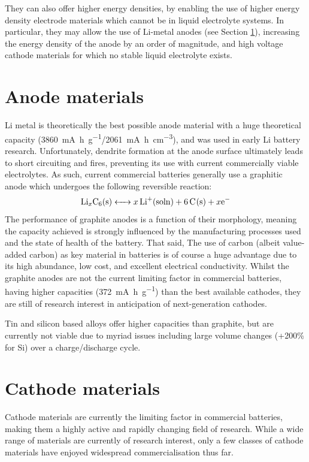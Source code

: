 They can also offer higher energy densities, by enabling the use of higher energy density electrode materials which cannot be in liquid electrolyte systems.
In particular, they may allow the use of Li-metal anodes (see Section \ref{sec:anodes}), increasing the energy density of the anode by an order of magnitude,\cite{Zhang2018} and high voltage cathode materials for which no stable liquid electrolyte exists.
\newpage
\section{Anode materials}
\label{sec:anodes}
Li metal is theoretically the best possible anode material with a huge theoretical capacity (\SI{3860}{\milli\ampere\hour\per\gram}/\SI{2061}{\milli\ampere\hour\per\centi\meter\cubed}), and was used in early Li battery research. 
Unfortunately, dendrite formation at the anode surface ultimately leads to short circuiting and fires, preventing its use with current commercially viable electrolytes. \cite{Cheng2017,Guo2017a,Lin2017}
As such, current commercial batteries generally use a graphitic anode which undergoes the following reversible reaction:
\begin{equation}
\ce{Li_xC6(s) <-> $x$Li+(soln) +6C(s) + $x$e-}
\end{equation}
The performance of graphite anodes is a function of their morphology, meaning the capacity achieved is strongly influenced by the manufacturing processes used and the state of health of the battery.
That said, 
The use of carbon (albeit value-added carbon) as key material in batteries is of course a huge advantage due to its high abundance, low cost, and excellent electrical conductivity.
Whilst the graphite anodes are not the current limiting factor in commercial batteries, having higher capacities (\SI{372}{\milli\ampere\hour\per\gram}) than the best available cathodes, they are still of research interest in anticipation of next-generation cathodes.

Tin and silicon based alloys offer higher capacities than graphite, but are currently not viable due to myriad issues including large volume changes (+200\% for Si) over a charge/discharge cycle.\cite{Scrosati2011}

\newpage
\section{Cathode materials}
Cathode materials are currently the limiting factor in commercial batteries, making them a highly active and rapidly changing field of research.
While a wide range of materials are currently of research interest, only a few classes of cathode materials have enjoyed widespread commercialisation thus far.

